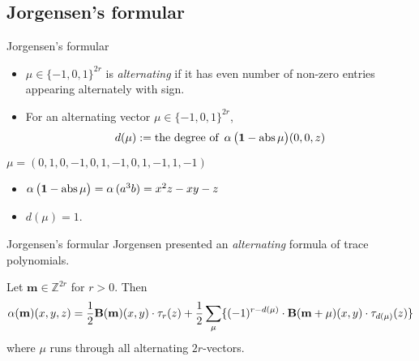 \documentclass[aspectratio={169}]{beamer}
\begin{document}
\subsection{Jorgensen's formular}
\begin{frame}{Jorgensen's formular}
\begin{itemize}
    \item   $\mu \in {\{-1,0,1\}}^{2r}$ is \emph{alternating} if it has even number of non-zero entries appearing alternately with sign. 
    \vskip 0.5cm
    \item For an alternating vector $\mu \in {\{-1,0,1}\}^{2r}$,
\begin{equation*}
    d(\mu) := \text{the degree of } \operatorname{\alpha}\big(\mathbf{1}-\operatorname{abs}{\mu}\big)(0,0,z)
\end{equation*}
\end{itemize}
\vskip 0.3cm
    $\mu = (0,1,0,-1,0,1,-1,0,1,-1,1,-1)$
\pause
\begin{itemize}
[boldarrow]
    \item $
\operatorname{\alpha}\big(\mathbf{1}-\operatorname{abs}{\mu}\big)= \operatorname{\alpha}{(a^3b)}=x^2z-xy-z$
\vskip 0.2cm
    \item $d(\mu) = 1$. 
\vskip 0.2cm
\end{itemize}
\end{frame}
\begin{frame}{Jorgensen's formular}
Jorgensen presented an \emph{alternating} formula of trace polynomials.
\begin{theorem}[Jorgensen]
Let $\mathbf{m} \in \mathbb{Z}^{2r}$ for $r>0$. Then
\begin{equation*}
\label{jorgensen}
\operatorname{\alpha}(\mathbf{m})(x,y,z) = \frac{1}{2}\mathbf{B}(\mathbf{m})(x,y)\cdot \tau_r(z)+ \frac{1}{2}\sum_{\mu}\{{(-1)^{r-d(\mu)}}\cdot \mathbf{B}(\mathbf{m}+\mu)(x,y) \cdot {\tau_{d(\mu)}(z)}\}
\end{equation*}
where $\mu$ runs through all alternating $2r$-vectors.
\end{theorem}
\end{frame}
\end{document}
